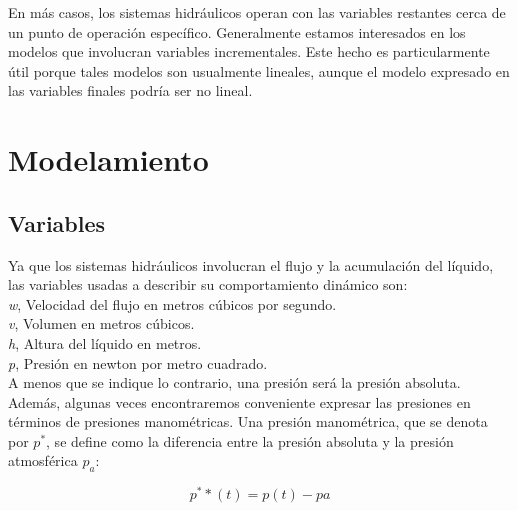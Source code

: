 \documentclass[a4paper,12pt,twoside]{proyectotanquesecci}
\begin{document}
En más casos, los sistemas hidráulicos operan con las variables restantes cerca de un punto de operación específico. Generalmente estamos interesados en los modelos que involucran variables incrementales. Este hecho es particularmente útil porque tales modelos son usualmente lineales, aunque el modelo expresado en las variables finales podría ser no lineal.\\





\newpage





\section{Modelamiento}


\subsection{Variables}

Ya que los sistemas hidráulicos involucran el flujo  y la acumulación del líquido, las variables usadas a describir su comportamiento dinámico son:\\

\textit{w}, Velocidad del flujo en metros cúbicos por segundo.\\ 

\textit{v}, Volumen en metros cúbicos.\\ 

\textit{h}, Altura del líquido en metros.\\ 

\textit{p}, Presión en newton por metro cuadrado.\\

A menos que se indique lo contrario, una presión será la presión absoluta. Además,  algunas veces encontraremos conveniente expresar las presiones en términos de presiones manométricas. Una presión manométrica, que se denota por $p^{*}$, se define como la diferencia entre la presión absoluta y la presión atmosférica ${p_{a}}$:

\begin{equation}
p^{*}*(t)=p(t)-pa
\label{Ecu 1}
\end{equation}
\end{document}
